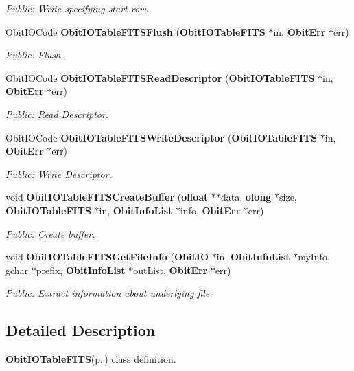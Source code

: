 \begin{CompactItemize}
\begin{CompactList}\small\item\em Public: Write specifying start row. \item\end{CompactList}\item 
Obit\-IOCode {\bf Obit\-IOTable\-FITSFlush} ({\bf Obit\-IOTable\-FITS} $\ast$in, {\bf Obit\-Err} $\ast$err)
\begin{CompactList}\small\item\em Public: Flush. \item\end{CompactList}\item 
Obit\-IOCode {\bf Obit\-IOTable\-FITSRead\-Descriptor} ({\bf Obit\-IOTable\-FITS} $\ast$in, {\bf Obit\-Err} $\ast$err)
\begin{CompactList}\small\item\em Public: Read Descriptor. \item\end{CompactList}\item 
Obit\-IOCode {\bf Obit\-IOTable\-FITSWrite\-Descriptor} ({\bf Obit\-IOTable\-FITS} $\ast$in, {\bf Obit\-Err} $\ast$err)
\begin{CompactList}\small\item\em Public: Write Descriptor. \item\end{CompactList}\item 
void {\bf Obit\-IOTable\-FITSCreate\-Buffer} ({\bf ofloat} $\ast$$\ast$data, {\bf olong} $\ast$size, {\bf Obit\-IOTable\-FITS} $\ast$in, {\bf Obit\-Info\-List} $\ast$info, {\bf Obit\-Err} $\ast$err)
\begin{CompactList}\small\item\em Public: Create buffer. \item\end{CompactList}\item 
void {\bf Obit\-IOTable\-FITSGet\-File\-Info} ({\bf Obit\-IO} $\ast$in, {\bf Obit\-Info\-List} $\ast$my\-Info, gchar $\ast$prefix, {\bf Obit\-Info\-List} $\ast$out\-List, {\bf Obit\-Err} $\ast$err)
\begin{CompactList}\small\item\em Public: Extract information about underlying file. \item\end{CompactList}\end{CompactItemize}


\subsection{Detailed Description}
{\bf Obit\-IOTable\-FITS}{\rm (p.\,\pageref{structObitIOTableFITS})} class definition. 

